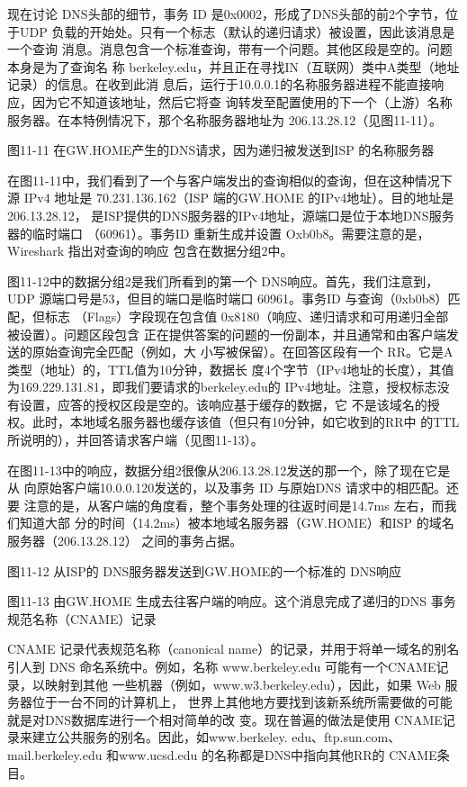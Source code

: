 现在讨论 DNS头部的细节，事务 ID 是0x0002，形成了DNS头部的前2个字节，位
于UDP 负载的开始处。只有一个标志（默认的递归请求）被设置，因此该消息是一个查询
消息。消息包含一个标准查询，带有一个问题。其他区段是空的。问题本身是为了查询名
称 berkeley.edu，并且正在寻找IN（互联网）类中A类型（地址记录）的信息。在收到此消
息后，运行于10.0.0.1的名称服务器进程不能直接响应，因为它不知道该地址，然后它将查
询转发至配置使用的下一个（上游）名称服务器。在本特例情况下，那个名称服务器地址为
206.13.28.12（见图11-11）。

图11-11
在GW.HOME产生的DNS请求，因为递归被发送到ISP 的名称服务器

在图11-11中，我们看到了一个与客户端发出的查询相似的查询，但在这种情况下源
IPv4 地址是 70.231.136.162（ISP 端的GW.HOME 的IPv4地址）。目的地址是206.13.28.12，
是ISP提供的DNS服务器的IPv4地址，源端口是位于本地DNS服务器的临时端口
（60961）。事务ID 重新生成并设置 Oxb0b8。需要注意的是，Wireshark 指出对查询的响应
包含在数据分组2中。

图11-12中的数据分组2是我们所看到的第一个 DNS响应。首先，我们注意到，UDP
源端口号是53，但目的端口是临时端口 60961。事务ID 与查询（0xb0b8）匹配，但标志
（Flags）字段现在包含值 0x8180（响应、递归请求和可用递归全部被设置）。问题区段包含
正在提供答案的问题的一份副本，并且通常和由客户端发送的原始查询完全匹配（例如，大
小写被保留）。在回答区段有一个 RR。它是A类型（地址）的，TTL值为10分钟，数据长
度4个字节（IPv4地址的长度），其值为169.229.131.81，即我们要请求的berkeley.edu的
IPv4地址。注意，授权标志没有设置，应答的授权区段是空的。该响应基于缓存的数据，它
不是该域名的授权。此时，本地域名服务器也缓存该值（但只有10分钟，如它收到的RR中
的TTL 所说明的），并回答请求客户端（见图11-13）。

在图11-13中的响应，数据分组2很像从206.13.28.12发送的那一个，除了现在它是从
向原始客户端10.0.0.120发送的，以及事务 ID 与原始DNS 请求中的相匹配。还要
注意的是，从客户端的角度看，整个事务处理的往返时间是14.7ms 左右，而我们知道大部
分的时间（14.2ms）被本地域名服务器（GW.HOME）和ISP 的域名服务器（206.13.28.12）
之间的事务占据。

图11-12 从ISP的 DNS服务器发送到GW.HOME的一个标准的 DNS响应

图11-13
由GW.HOME 生成去往客户端的响应。这个消息完成了递归的DNS 事务
规范名称（CNAME）记录

CNAME 记录代表规范名称（canonical name）的记录，并用于将单一域名的别名引人到
DNS 命名系统中。例如，名称 www.berkeley.edu 可能有一个CNAME记录，以映射到其他
一些机器（例如，www.w3.berkeley.edu），因此，如果 Web 服务器位于一台不同的计算机上，
世界上其他地方要找到该新系统所需要做的可能就是对DNS数据库进行一个相对简单的改
变。现在普遍的做法是使用 CNAME记录来建立公共服务的别名。因此，如www.berkeley.
edu、ftp.sun.com、mail.berkeley.edu 和www.ucsd.edu 的名称都是DNS中指向其他RR的
CNAME条目。

